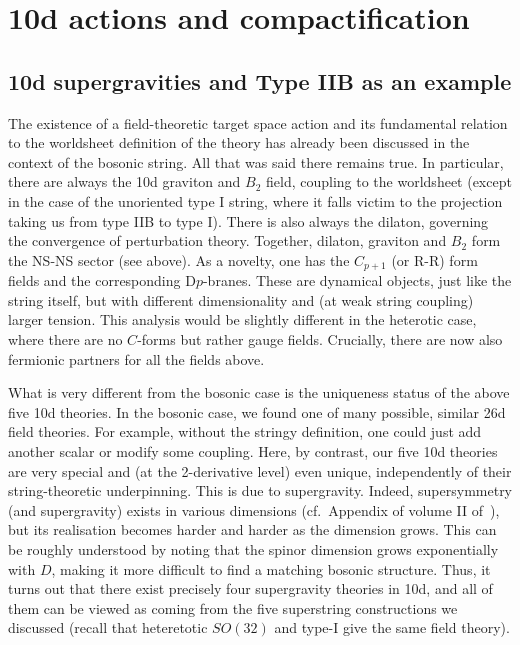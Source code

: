 \documentclass[12pt]{article}
\numberwithin{equation}{section}
\begin{document}
\section{10d actions and compactification}\label{comp}

\subsection{10d supergravities and Type IIB as an example}

The existence of a field-theoretic target space action and its fundamental relation to the worldsheet definition of the theory has already been discussed in the context of the bosonic string. All that was said there remains true. In particular, there are always the 10d graviton and $B_2$ field, coupling to the worldsheet (except in the case of the unoriented type I string, where it falls victim to the projection taking us from type IIB to type I). There is also always the dilaton, governing the convergence of perturbation theory. Together, dilaton, graviton and $B_2$ form the NS-NS sector (see above). As a novelty, one has the $C_{p+1}$ (or R-R) form fields and the corresponding D$p$-branes. These are dynamical objects, just like the string itself, but with different dimensionality and (at weak string coupling) larger tension. This analysis would be slightly different in the heterotic case, where there are no $C$-forms but rather gauge fields. Crucially, there are now also fermionic partners for all the fields above. 

What is very different from the bosonic case is the uniqueness status of the above five 10d theories. In the bosonic case, we found one of many possible, similar 26d field theories. For example, without the stringy definition, one could just add another scalar or modify some coupling. Here, by contrast, our five 10d theories are very special and (at the 2-derivative level) even unique, independently of their string-theoretic underpinning. This is due to supergravity. Indeed, supersymmetry (and supergravity) exists in various dimensions (cf.~Appendix of volume II of~\cite{Polchinski:1998rq}), but its realisation becomes harder and harder as the dimension grows. This can be roughly understood by noting that the spinor dimension grows exponentially with $D$, making it more difficult to find a matching bosonic structure. Thus, it turns out that there exist precisely four supergravity theories in 10d, and all of them can be viewed as coming from the five superstring constructions we discussed (recall that  heteretotic $SO(32)$ and type-I give the same field theory).
\end{document}
